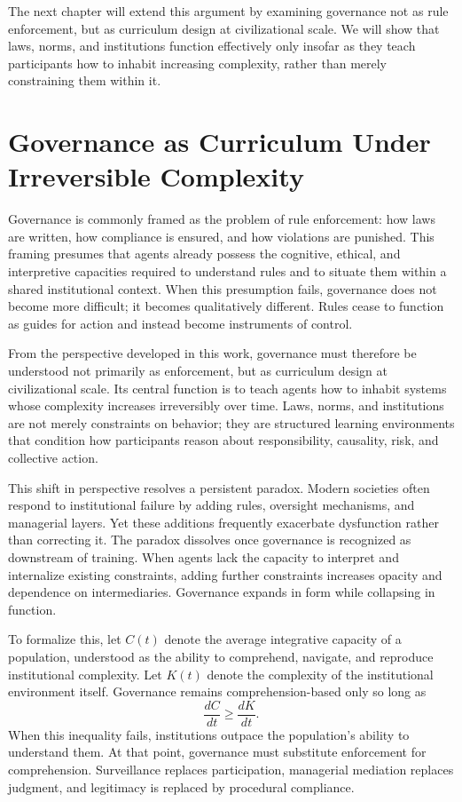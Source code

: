 \documentclass[12pt,oneside]{book}
\begin{document}
The next chapter will extend this argument by examining governance not as rule enforcement, but as curriculum design at civilizational scale. We will show that laws, norms, and institutions function effectively only insofar as they teach participants how to inhabit increasing complexity, rather than merely constraining them within it.

\chapter{Governance as Curriculum Under Irreversible Complexity}

Governance is commonly framed as the problem of rule enforcement: how laws are written, how compliance is ensured, and how violations are punished. This framing presumes that agents already possess the cognitive, ethical, and interpretive capacities required to understand rules and to situate them within a shared institutional context. When this presumption fails, governance does not become more difficult; it becomes qualitatively different. Rules cease to function as guides for action and instead become instruments of control.

From the perspective developed in this work, governance must therefore be understood not primarily as enforcement, but as curriculum design at civilizational scale. Its central function is to teach agents how to inhabit systems whose complexity increases irreversibly over time. Laws, norms, and institutions are not merely constraints on behavior; they are structured learning environments that condition how participants reason about responsibility, causality, risk, and collective action.

This shift in perspective resolves a persistent paradox. Modern societies often respond to institutional failure by adding rules, oversight mechanisms, and managerial layers. Yet these additions frequently exacerbate dysfunction rather than correcting it. The paradox dissolves once governance is recognized as downstream of training. When agents lack the capacity to interpret and internalize existing constraints, adding further constraints increases opacity and dependence on intermediaries. Governance expands in form while collapsing in function.

To formalize this, let \(C(t)\) denote the average integrative capacity of a population, understood as the ability to comprehend, navigate, and reproduce institutional complexity. Let \(K(t)\) denote the complexity of the institutional environment itself. Governance remains comprehension-based only so long as
\[
\frac{dC}{dt} \geq \frac{dK}{dt}.
\]
When this inequality fails, institutions outpace the population’s ability to understand them. At that point, governance must substitute enforcement for comprehension. Surveillance replaces participation, managerial mediation replaces judgment, and legitimacy is replaced by procedural compliance.
\end{document}
